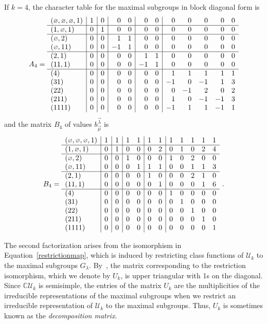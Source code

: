 \documentclass[ALCO,Unicode]{cedram}
\newcommand{\defncolor}{\color{darkred}}
\newcommand{\defn}[1]{{\defncolor\emph{#1}}} %
\newcommand{\CC}{\mathbb C}
\newcommand{\epart}{\text{\footnotesize$\varnothing$}}
\begin{document}
\begin{example}
If $k = 4$, the character table for the maximal
subgroups in block diagonal form is
$$
A_4 = \begin{array}{l|r|r|rr|rr|rrrrr}
(\epart, \epart, \epart, 1) & 1 & 0 & 0 & 0 & 0 & 0 & 0 & 0 & 0 & 0 & 0\\
\hline
(1, \epart, 1) &0 & 1 & 0 & 0 & 0 & 0 & 0 & 0 & 0 & 0 & 0\\
\hline
(\epart, 2) &0 & 0 & 1 & 1 & 0 & 0 & 0 & 0 & 0 & 0 & 0\\
(\epart, 11) &0 & 0 & -1 & 1 & 0 & 0 & 0 & 0 & 0 & 0 & 0\\
\hline
(2, 1) &0 & 0 & 0 & 0 & 1 & 1 & 0 & 0 & 0 & 0 & 0\\
(11, 1) &0 & 0 & 0 & 0 & -1 & 1 & 0 & 0 & 0 & 0 & 0\\
\hline
(4) &0 & 0 & 0 & 0 & 0 & 0 & 1 & 1 & 1 & 1 & 1\\
(31) &0 & 0 & 0 & 0 & 0 & 0 & -1 & 0 & -1 & 1 & 3\\
(22) &0 & 0 & 0 & 0 & 0 & 0 & 0 & -1 & 2 & 0 & 2\\
(211) &0 & 0 & 0 & 0 & 0 & 0 & 1 & 0 & -1 & -1 & 3\\
(1111) &0 & 0 & 0 & 0 & 0 & 0 & -1 & 1 & 1 & -1 & 1
\end{array}
$$
and the matrix
$B_4$ of values $b^{\vec{\lambda}}_{\vec{\mu}}$ is
$$
B_4 = \begin{array}{l|r|r|rr|rr|rrrrr}
(\epart, \epart, \epart, 1) & 1 & 1 & 1 & 1 & 1 & 1 & 1 & 1 & 1 & 1 & 1\\
\hline
(1, \epart, 1) &0 & 1 & 0 & 0 & 0 & 2 & 0 & 1 & 0 & 2 & 4\\
\hline
(\epart, 2) &0 & 0 & 1 & 0 & 0 & 0 & 1 & 0 & 2 & 0 & 0\\
(\epart, 11) &0 & 0 & 0 & 1 & 1 & 1 & 0 & 0 & 1 & 1 & 3\\
\hline
(2, 1) &0 & 0 & 0 & 0 & 1 & 0 & 0 & 0 & 2 & 1 & 0\\
(11, 1) &0 & 0 & 0 & 0 & 0 & 1 & 0 & 0 & 0 & 1 & 6\\
\hline
(4) &0 & 0 & 0 & 0 & 0 & 0 & 1 & 0 & 0 & 0 & 0\\
(31) &0 & 0 & 0 & 0 & 0 & 0 & 0 & 1 & 0 & 0 & 0\\
(22) &0 & 0 & 0 & 0 & 0 & 0 & 0 & 0 & 1 & 0 & 0\\
(211) &0 & 0 & 0 & 0 & 0 & 0 & 0 & 0 & 0 & 1 & 0\\
(1111) &0 & 0 & 0 & 0 & 0 & 0 & 0 & 0 & 0 & 0 & 1
\end{array}~.
$$
\end{example}

The second factorization arises from the isomorphism in
Equation~\eqref{restrictionmap}, which is induced by restricting class
functions of $\mathcal{U}_k$ to the maximal subgroups $G_\lambda$.
By~\cite[Theorem 6.5]{Steinberg.2016}, the matrix corresponding to the restriction isomorphism,
which we denote by $U_k$, is upper triangular with 1s on the diagonal. Since $\CC\mathcal{U}_k$
is semisimple, the entries of the matrix $U_k$ are the multiplicities of the
irreducible representations of the maximal subgroups when we restrict an
irreducible representation of $\mathcal{U}_k$ to the maximal subgroups.
Thus, $U_k$ is sometimes known as the \defn{decomposition matrix}.
\end{document}
